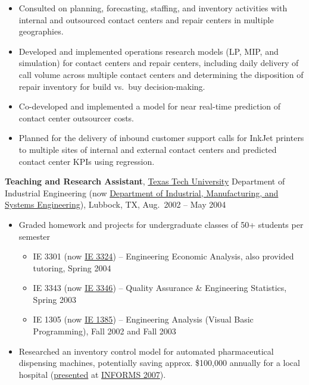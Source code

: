 \documentclass[
]{article}
\providecommand{\tightlist}{%
  \setlength{\itemsep}{0pt}\setlength{\parskip}{0pt}}
\begin{document}
\begin{itemize}
\tightlist
\item
  Consulted on planning, forecasting, staffing, and inventory activities
  with internal and outsourced contact centers and repair centers in
  multiple geographies.
\item
  Developed and implemented operations research models (LP, MIP, and
  simulation) for contact centers and repair centers, including daily
  delivery of call volume across multiple contact centers and
  determining the disposition of repair inventory for build vs.~buy
  decision-making.
\item
  Co-developed and implemented a model for near real-time prediction of
  contact center outsourcer costs.
\item
  Planned for the delivery of inbound customer support calls for InkJet
  printers to multiple sites of internal and external contact centers
  and predicted contact center KPIs using regression.
\end{itemize}

\textbf{Teaching and Research Assistant},
\href{https://www.ttu.edu/}{Texas Tech University} Department of
Industrial Engineering (now
\href{https://www.depts.ttu.edu/imse/}{Department of Industrial,
Manufacturing, and Systems Engineering}), Lubbock, TX, Aug.~2002 -- May
2004

\begin{itemize}
\tightlist
\item
  Graded homework and projects for undergraduate classes of 50+ students
  per semester

  \begin{itemize}
  \tightlist
  \item
    IE 3301 (now
    \href{https://catalog.ttu.edu/preview_course_nopop.php?catoid=2\&coid=9209}{IE
    3324}) -- Engineering Economic Analysis, also provided tutoring,
    Spring 2004
  \item
    IE 3343 (now
    \href{https://catalog.ttu.edu/preview_course_nopop.php?catoid=2\&coid=9217}{IE
    3346}) -- Quality Assurance \& Engineering Statistics, Spring 2003
  \item
    IE 1305 (now
    \href{https://catalog.ttu.edu/preview_course_nopop.php?catoid=2\&coid=9206}{IE
    1385}) -- Engineering Analysis (Visual Basic Programming), Fall 2002
    and Fall 2003
  \end{itemize}
\item
  Researched an inventory control model for automated pharmaceutical
  dispensing machines, potentially saving approx. \$100,000 annually for
  a local hospital
  (\href{https://stevemyles.site/blog/2007/10/30/informs-2007-presentations/}{presented}
  at
  \href{https://web.archive.org/web/20140731003202/http://meetings2.informs.org/Seattle07/}{INFORMS
  2007}).
\end{itemize}
\end{document}
